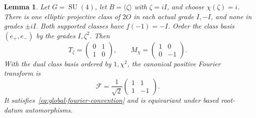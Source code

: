 \documentclass[11pt,a4paper,reqno]{amsart}
\theoremstyle{plain}
\newtheorem{lemma}[theorem]{Lemma}
\theoremstyle{definition}
\theoremstyle{remark}
\numberwithin{equation}{section}
\newcommand{\SU}{\operatorname{SU}}
\begin{document}
\begin{lemma}\label{lem:octahedral-su4}
Let $G=\SU(4)$, let $B=\langle\zeta\rangle$ with $\zeta=iI$, and choose $\chi(\zeta)=i$. There is one elliptic projective class of $2O$ in each actual grade $I,-I$, and none in grades $\pm iI$. Both supported classes have $f(-1)=-I$. Order the class basis $(e_+,e_-)$ by the grades $I,\zeta^2$. Then
\begin{equation}\label{eq:octahedral-su4-operators}
T_\zeta=\begin{pmatrix}0&1\\1&0\end{pmatrix},
\qquad
M_\chi=\begin{pmatrix}1&0\\0&-1\end{pmatrix}.
\end{equation}
With the dual class basis ordered by $1,\chi^2$, the canonical positive Fourier transform is
\begin{equation}\label{eq:octahedral-su4-fourier}
\mathcal F=\frac1{\sqrt2}\begin{pmatrix}1&1\\1&-1\end{pmatrix}.
\end{equation}
It satisfies~\eqref{eq:global-fourier-convention} and is equivariant under based root-datum automorphisms.
\end{lemma}
\end{document}
